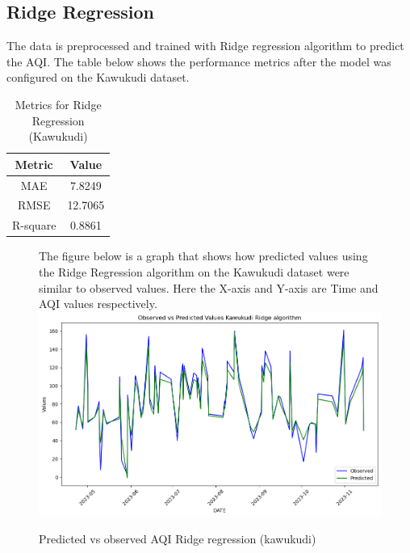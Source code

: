 \documentclass{book}
\numberwithin{equation}{section}
\numberwithin{figure}{section}
\begin{document}
\subsection{Ridge Regression}
The data is preprocessed and trained with Ridge regression algorithm to predict the AQI. The table below shows the performance metrics after the model was configured on the Kawukudi dataset.\\
\begin{table}[H]
    \centering
    \begin{tabular}{|c|c|}
        \hline
        \textbf{Metric} & \textbf{Value} \\
        \hline
        MAE & 7.8249 \\
        \hline
        RMSE & 12.7065\\
        \hline
        R-square & 0.8861 \\
        \hline
    \end{tabular}
    \caption{Metrics for Ridge Regression (Kawukudi)}
    \label{tab: Ridge metrics(Kawukudi)}
\end{table}
\begin{figure}[H]
 \begin{minipage}{\linewidth}
        The figure below is a graph that shows how predicted values using the Ridge Regression algorithm on the Kawukudi dataset were similar to observed values. Here the X-axis and Y-axis are Time and AQI values respectively.
        \vspace{0.5em} 
        \includegraphics[width=\linewidth]{kawukudi ridge.png}
       
        \caption{ Predicted vs observed AQI Ridge regression (kawukudi)}
        \label{fig: Ridge predicted vs observed AQI(Kawukudi)}
    \end{minipage}
\end{figure}
\end{document}
